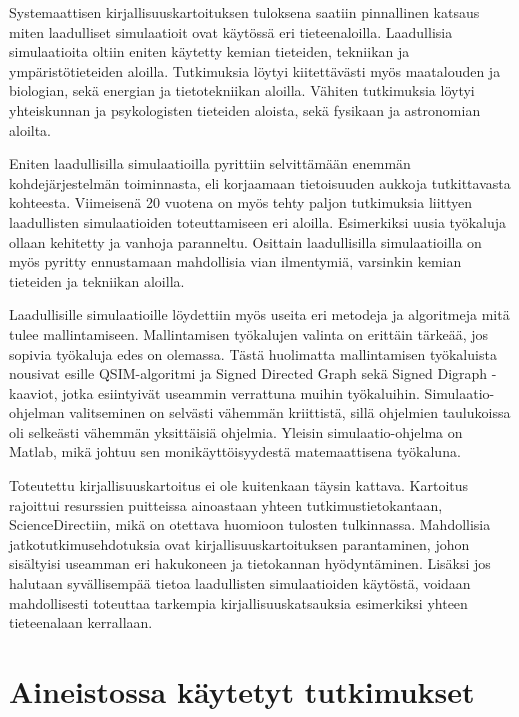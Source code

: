 \documentclass[utf8]{gradu3}
\begin{document}
Systemaattisen kirjallisuuskartoituksen tuloksena saatiin pinnallinen katsaus miten 
laadulliset simulaatioit ovat käytössä eri tieteenaloilla. 
Laadullisia simulaatioita oltiin eniten käytetty kemian tieteiden, 
tekniikan ja ympäristötieteiden aloilla. Tutkimuksia löytyi kiitettävästi myös
maatalouden ja biologian, sekä energian ja tietotekniikan aloilla. 
Vähiten tutkimuksia löytyi yhteiskunnan ja psykologisten tieteiden aloista, sekä 
fysikaan ja astronomian aloilta.

Eniten laadullisilla simulaatioilla pyrittiin
selvittämään enemmän kohdejärjestelmän toiminnasta, eli korjaamaan tietoisuuden aukkoja
tutkittavasta kohteesta. Viimeisenä 20 vuotena on myös tehty paljon tutkimuksia liittyen 
laadullisten simulaatioiden toteuttamiseen eri aloilla. 
Esimerkiksi uusia työkaluja ollaan kehitetty ja vanhoja paranneltu.
Osittain laadullisilla simulaatioilla on myös pyritty ennustamaan mahdollisia vian 
ilmentymiä, varsinkin kemian tieteiden ja tekniikan aloilla.

Laadullisille simulaatioille löydettiin myös useita eri metodeja ja algoritmeja 
mitä tulee mallintamiseen. Mallintamisen työkalujen valinta on erittäin tärkeää,
jos sopivia työkaluja edes on olemassa. Tästä huolimatta mallintamisen työkaluista
nousivat esille QSIM-algoritmi ja Signed Directed Graph sekä Signed Digraph -kaaviot, 
jotka esiintyivät useammin verrattuna muihin työkaluihin.
Simulaatio-ohjelman valitseminen on selvästi vähemmän kriittistä, sillä ohjelmien taulukoissa
oli selkeästi vähemmän yksittäisiä ohjelmia. 
Yleisin simulaatio-ohjelma on Matlab, mikä johtuu sen monikäyttöisyydestä 
matemaattisena työkaluna.

Toteutettu kirjallisuuskartoitus ei ole kuitenkaan täysin kattava. 
Kartoitus rajoittui resurssien puitteissa ainoastaan yhteen tutkimustietokantaan,
ScienceDirectiin, mikä on otettava huomioon tulosten tulkinnassa. 
Mahdollisia jatkotutkimusehdotuksia ovat kirjallisuuskartoituksen parantaminen, 
johon sisältyisi useamman eri hakukoneen ja tietokannan hyödyntäminen.
Lisäksi jos halutaan syvällisempää tietoa laadullisten simulaatioiden käytöstä, 
voidaan mahdollisesti toteuttaa tarkempia kirjallisuuskatsauksia esimerkiksi yhteen 
tieteenalaan kerrallaan.

\printbibliography

\appendix
\section{Aineistossa käytetyt tutkimukset}
\end{document}
